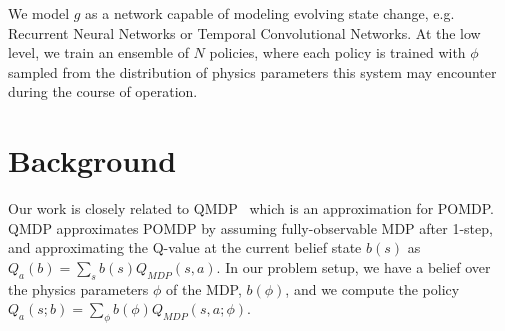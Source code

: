 \documentclass{article}
\begin{document}
We model $g$ as a network capable of modeling evolving state change, e.g. Recurrent Neural Networks or Temporal Convolutional Networks. At the low level, we train an ensemble of $N$ policies, where each policy is trained with $\phi$ sampled from the distribution of physics parameters this system may encounter during the course of operation.

\section{Background}
Our work is closely related to QMDP~\cite{littman1995learning, karkus2017qmdp} which is an approximation for POMDP. QMDP approximates POMDP by assuming fully-observable MDP after 1-step, and approximating the Q-value at the current belief state $b(s)$ as $Q_a(b) =\sum_s b(s)Q_{MDP}(s, a)$. In our problem setup, we have a belief over the physics parameters $\phi$ of the MDP, $b(\phi)$, and we compute the policy $Q_a(s;b) = \sum_\phi b(\phi)Q_{MDP}(s,a;\phi)$.



\end{document}
